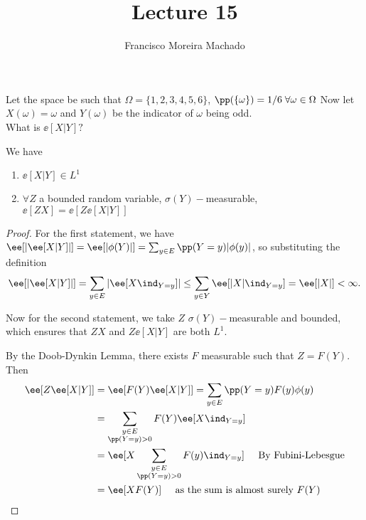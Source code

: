 \documentclass[../main.tex]{subfiles}
\author{Francisco Moreira Machado}
\title{Lecture 15}
\begin{document}
\begin{example}
  Let the space be such that
    $\Omega = \{ 1,2,3,4,5,6 \} $, $\pp(\{ \omega \} ) = 1/6 \;\forall \omega \in \Omega$
  Now let $X(\omega) = \omega$ and $Y(\omega)$ be the indicator of $\omega$ being odd.
  \\
  What is $\ee[X | Y]?$
\end{example}

\begin{lemma}
    We have
    \begin{enumerate}
      \item $\ee[X | Y] \in L^1$
      \item $\forall Z$ a bounded random variable, $\sigma(Y)-$measurable, 
        $\ee[ZX] = \ee[Z\ee[X | Y]]$
    \end{enumerate}
\end{lemma}
\begin{proof}
  For the first statement, we have $\ee[ |\ee[X | Y] |] = \ee[|\phi(Y)|] =
  \sum_{y \in E} \pp(Y = y) |\phi(y)|$, so substituting the definition 
  \[
    \ee[|\ee[X | Y]|] = \sum_{y \in E} |\ee[X \ind_{Y = y}]| \leq \sum_{y \in
    Y} \ee[|X| \ind_{Y = y}] = \ee[|X|] < \infty
  .\] 

  \vspace{0.5em}\noindent
  Now for the second statement, we take $Z$ $\sigma(Y)-$measurable and
  bounded, which ensures that $ZX$ and $Z\ee[X | Y]$ are both $L^1$. 

  By the Doob-Dynkin Lemma, there exists $F$ measurable such that 
  $Z = F(Y)$. Then 
  \begin{align*}
    \ee[Z \ee[X | Y]] &= \ee[F(Y) \ee[X | Y]] = \sum_{y \in E}
    \pp(Y = y) F(y) \phi(y)  \\
    &= \sum_{\substack{y \in E \\ \pp(Y = y) > 0}} F(Y) \ee[X \ind_{Y = y}] \\
    &= \ee [ X \sum_{\substack{y \in E \\ \pp(Y = y) > 0}} F(y) \ind_{Y =
    y} ] \;\;\;\;\;\text{By Fubini-Lebesgue} \\
    &= \ee[X F(Y)] \;\;\;\;\;\text{as the sum is almost surely $F(Y)$}
  \end{align*}
\end{proof}
\end{document}
